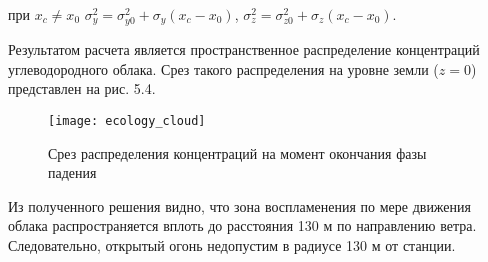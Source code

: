 при $x_c \neq x_0$ $\sigma_y^2 = \sigma_{y0}^2 + \sigma_y(x_c - x_0)$, $\sigma_z^2 = \sigma_{z0}^2 + \sigma_z(x_c - x_0)$.

Результатом расчета является пространственное распределение концентраций углеводородного облака. Срез такого распределения на уровне земли ($z=0$) представлен на рис. 5.4.

\begin{figure}[H]
	\centering
	\texttt{[image: ecology\_cloud]}
	\caption{Срез распределения концентраций на момент окончания фазы падения}
\end{figure}

Из полученного решения видно, что зона воспламенения по мере движения облака распространяется вплоть до расстояния 130 м по направлению ветра. Следовательно, открытый огонь недопустим в радиусе 130 м от станции.
